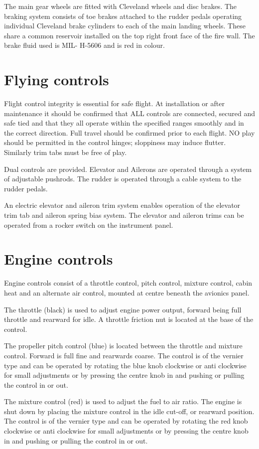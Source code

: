 The main gear wheels are fitted with Cleveland wheels and disc brakes. The braking system consists of toe
brakes attached to the rudder pedals operating individual Cleveland brake cylinders to each of the main landing
wheels.
These share a common reservoir installed on the top right front face of the fire wall. The brake fluid used is MIL-
H-5606 and is red in colour.

\section{Flying controls}
Flight control integrity is essential for safe flight. At installation or after maintenance it should be confirmed that
ALL controls are connected, secured and safe tied and that they all operate within the specified ranges
smoothly and in the correct direction. Full travel should be confirmed prior to each flight. NO play should be
permitted in the control hinges; sloppiness may induce flutter. Similarly trim tabs must be free of play.

Dual controls are provided. Elevator and Ailerons are operated through a system of adjustable pushrods. The
rudder is operated through a cable system to the rudder pedals. 

An electric elevator and aileron trim system
enables operation of the elevator trim tab and aileron spring bias system.
The elevator and aileron trims can be operated from a rocker switch on the instrument panel. 

\section{Engine controls}
Engine controls consist of a throttle control, pitch control, mixture control,
cabin heat and an alternate air control, mounted at centre beneath the avionics panel.

The throttle (black) is used to adjust engine power output, forward being full throttle and rearward for idle. A
throttle friction nut is located at the base of the control.

The propeller pitch control (blue) is located between the throttle and mixture control. Forward is full fine and
rearwards coarse. The control is of the vernier type and can be operated by rotating the blue knob clockwise or
anti clockwise for small adjustments or by pressing the centre knob in and pushing or pulling the control in or
out.

The mixture control (red) is used to adjust the fuel to air ratio. The engine is shut down by placing the mixture
control in the idle cut-off, or rearward position. The control is of the vernier type and can be operated by rotating
the red knob clockwise or anti clockwise for small adjustments or by pressing the centre knob in and pushing or
pulling the control in or out.

